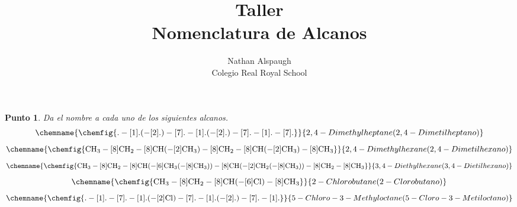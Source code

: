 \documentclass{article}
\title{Taller \\ Nomenclatura de Alcanos}
\author{Nathan Alspaugh \\ Colegio Real Royal School}
\begin{document}
\maketitle
\newtheorem{namefromgraph}{Punto}
\begin{namefromgraph}
    Da el nombre a cada uno de los siguientes alcanos.
    \begin{equation}
        \chemname{\chemfig{.-[1].(-[2].)-[7].-[1].(-[2].)-[7].-[1].-[7].}}{2,4-Dimethylheptane (2,4-Dimetilheptano)}
    \end{equation}
    \begin{equation}
        \chemname{\chemfig{\ce{CH3}-[8]\ce{CH2}-[8]\ce{CH}(-[2]\ce{CH3})-[8]\ce{CH2}-[8]\ce{CH}(-[2]\ce{CH3})-[8]\ce{CH3}}}{2,4-Dimethylhexane (2,4-Dimetilhexano)}
    \end{equation}
    \begin{equation}
        \chemname{\chemfig{\ce{CH3}-[8]\ce{CH2}-[8]\ce{CH}(-[6]\ce{CH3}(-[8]\ce{CH3}))-[8]\ce{CH}(-[2]\ce{CH2}(-[8]\ce{CH3}))-[8]\ce{CH2}-[8]\ce{CH3}}}{3,4-Diethylhexane (3,4-Dietilhexano)}
    \end{equation}
    \begin{equation}
        \chemname{\chemfig{\ce{CH3}-[8]\ce{CH2}-[8]\ce{CH}(-[6]\ce{Cl})-[8]\ce{CH3}}}{2-Chlorobutane (2-Clorobutano)}
    \end{equation}
    \begin{equation}
        \chemname{\chemfig{.-[1].-[7].-[1].(-[2]\ce{Cl})-[7].-[1].(-[2].)-[7].-[1].}}{5-Chloro-3-Methyloctane (5-Cloro-3-Metiloctano)}
    \end{equation}

\end{namefromgraph}
\end{document}
